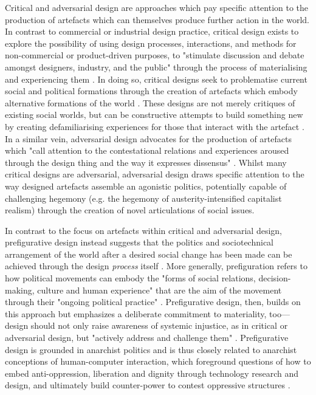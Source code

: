 Critical and adversarial design are approaches which pay specific attention to the production of artefacts which can themselves produce further action in the world. In contrast to commercial or industrial design practice, critical design exists to explore the possibility of using design processes, interactions, and methods for non-commercial or product-driven purposes, to "stimulate discussion and debate amongst designers, industry, and the public"  \citep[p. 58]{dunne_design_2001} through the process of materialising and experiencing them \citep{malpass_critical_2019}. In doing so, critical designs seek to problematise current social and political formations through the creation of artefacts which embody alternative formations of the world \citep{bardzell_reading_2014}. These designs are not merely critiques of existing social worlds, but can be constructive attempts to build something new by creating defamiliarising experiences for those that interact with the artefact \citep{blythe_imaginary_2018}. In a similar vein, adversarial design advocates for the production of artefacts which "call attention to the contestational relations and experiences aroused through the design thing and the way it expresses dissensus" \citep[p. 7]{disalvo_adversarial_2012}. Whilst many critical designs are adversarial, adversarial design draws specific attention to the way designed artefacts assemble an agonistic politics, potentially capable of challenging hegemony (e.g. the hegemony of austerity-intensified capitalist realism) through the creation of novel articulations of social issues. 

In contrast to the focus on artefacts within critical and adversarial design, prefigurative design instead suggests that the politics and sociotechnical arrangement of the world after a desired social change has been made can be achieved through the design \textit{process} itself \citep{asad_creating_2017}. More generally, prefiguration refers to how political movements can embody the "forms of social relations, decision-making, culture and human experience" that are the aim of the movement through their "ongoing political practice" \cite[p. 7]{boggs_marxism_1977}. Prefigurative design, then, builds on this approach but emphasizes a deliberate commitment to materiality, too—design should not only raise awareness of systemic injustice, as in critical or adversarial design, but "actively address and challenge them" \citep[p. 99]{asad_prefigurative_2018}. Prefigurative design is grounded in anarchist politics and is thus closely related to anarchist conceptions of human-computer interaction, which foreground questions of how to embed anti-oppression, liberation and dignity through technology research and design, and ultimately build counter-power to contest oppressive structures \citep{keyes_human-computer_2019, asad_prefigurative_2019}. 

